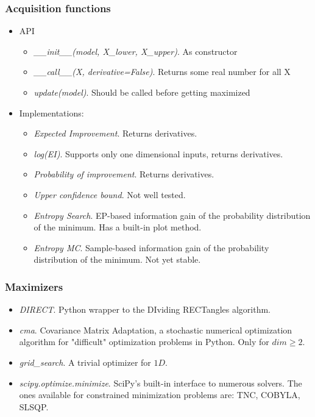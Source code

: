 \documentclass[10pt,handout]{beamer}
\begin{document}
\begin{frame}
\frametitle{Acquisition functions}
\begin{itemize}
\item API
\begin{itemize}
\item \textit{\_\_init\_\_(model, X\_lower, X\_upper)}. As constructor
\item \textit{\_\_call\_\_(X, derivative=False)}. Returns some real number for all X
\item \textit{update(model)}. Should be called before getting maximized
\end{itemize}
\item Implementations:
\begin{itemize}
\item \textit{Expected Improvement}. Returns derivatives.
\item \textit{log(EI)}. Supports only one dimensional inputs, returns derivatives.
\item \textit{Probability of improvement}. Returns derivatives.
\item \textit{Upper confidence bound}. Not well tested.
\item \textit{Entropy Search}. EP-based information gain of the probability distribution
of the minimum. Has a built-in plot method.
\item \textit{Entropy MC}. Sample-based information gain of the probability distribution
of the minimum. Not yet stable.
\end{itemize}
\end{itemize}
\end{frame}

\begin{frame}
\frametitle{Maximizers}



\begin{itemize}

\item \textit{DIRECT}. Python wrapper to the DIviding RECTangles algorithm.
\item \textit{cma}. Covariance Matrix Adaptation, a stochastic numerical
optimization algorithm for "difficult" optimization problems in Python. Only
for $dim \geq 2$.
\item \textit{grid\_search}. A trivial optimizer for $1D$.
\item \textit{scipy.optimize.minimize}. SciPy's built-in interface to numerous
solvers. The ones available for constrained minimization problems are: %
TNC, COBYLA, SLSQP.


\end{itemize}

\end{frame}
\end{document}
